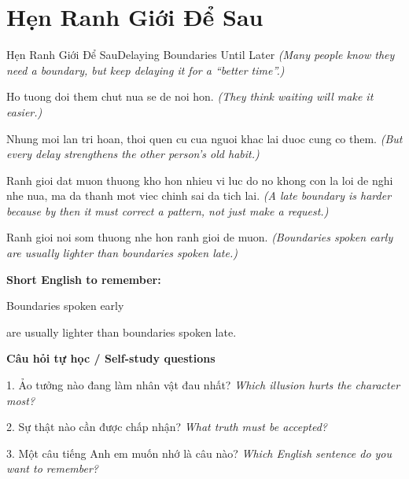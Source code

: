 \section{Hẹn Ranh Giới Để Sau}
\begin{truyen}{Hẹn Ranh Giới Để Sau}{Delaying Boundaries Until Later}
\textit{(Many people know they need a boundary, but keep delaying it for a “better time”.)}

Ho tuong doi them chut nua se de noi hon.
\textit{(They think waiting will make it easier.)}

Nhung moi lan tri hoan, thoi quen cu cua nguoi khac lai duoc cung co them.
\textit{(But every delay strengthens the other person’s old habit.)}

Ranh gioi dat muon thuong kho hon nhieu vi luc do no khong con la loi de nghi nhe nua, ma da thanh mot viec chinh sai da tich lai.
\textit{(A late boundary is harder because by then it must correct a pattern, not just make a request.)}

\end{truyen}

\begin{baihoc}
Ranh gioi noi som thuong nhe hon ranh gioi de muon.
\textit{(Boundaries spoken early are usually lighter than boundaries spoken late.)}
\end{baihoc}

\begin{ghinhoanh}
\textbf{Short English to remember:}

Boundaries spoken early

are usually lighter than boundaries spoken late.

\end{ghinhoanh}

\begin{tuhocnhanh}
\textbf{Câu hỏi tự học / Self-study questions}

1. Ảo tưởng nào đang làm nhân vật đau nhất? \textit{Which illusion hurts the character most?}

2. Sự thật nào cần được chấp nhận? \textit{What truth must be accepted?}

3. Một câu tiếng Anh em muốn nhớ là câu nào? \textit{Which English sentence do you want to remember?}
\end{tuhocnhanh}
\ngancach

